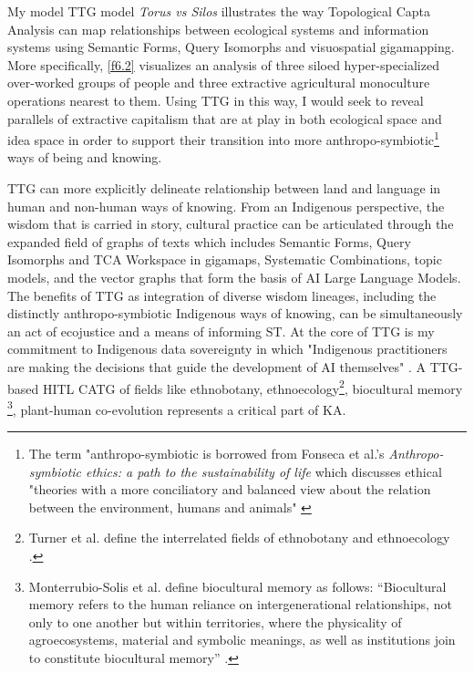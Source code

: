 My model TTG model \textit{Torus vs Silos} illustrates the way Topological Capta Analysis can map relationships between ecological systems and information systems using Semantic Forms, Query Isomorphs and visuospatial gigamapping. More specifically, \autoref{f6.2}  visualizes an analysis of three siloed hyper-specialized over-worked groups of people and three extractive agricultural monoculture operations nearest to them. Using TTG in this way, I  would seek to reveal parallels of extractive capitalism that are at play in both ecological space and idea space in order to support their transition into more anthropo-symbiotic\footnote{The term "anthropo-symbiotic is borrowed from Fonseca et al.'s \textit{Anthropo-symbiotic ethics: a path to the sustainability of life} which discusses ethical "theories with a more conciliatory and balanced view about the relation between the environment, humans and animals" \citep{fonseca_anthropo-symbiotic_2022}} ways of being and knowing. 


TTG can more explicitly delineate relationship between land and language in human and non-human ways of knowing. From an Indigenous perspective, the wisdom that is carried in story, cultural practice can be articulated through the expanded field of graphs of texts which includes Semantic Forms, Query Isomorphs and TCA Workspace in gigamaps, Systematic Combinations, topic models, and the vector graphs that form the basis of AI Large Language Models. The benefits of TTG as integration of diverse wisdom lineages, including the distinctly anthropo-symbiotic Indigenous ways of knowing, can be simultaneously an act of ecojustice and a means of informing ST. At the core of TTG is my commitment to Indigenous data sovereignty \citep[p. 12]{lewis_abundant_2024} in which "Indigenous practitioners are making the decisions that guide the development of AI themselves" \citep[p. 8]{lewis_abundant_2024}. A TTG-based HITL CATG of fields like ethnobotany, ethnoecology\footnote{Turner et al. define the interrelated fields of ethnobotany and ethnoecology \citep[p. 6-7]{turner_introduction_2020}.}, biocultural memory 
\footnote{Monterrubio-Solis et al. define biocultural memory as follows: “Biocultural memory refers to the human reliance on intergenerational relationships, not only to one another but within territories, where the physicality of agroecosystems, material and symbolic meanings, as well as institutions join to constitute biocultural memory” \citep{monterrubio-solis_narrating_2023}.}, plant-human co-evolution represents a critical part of KA.

